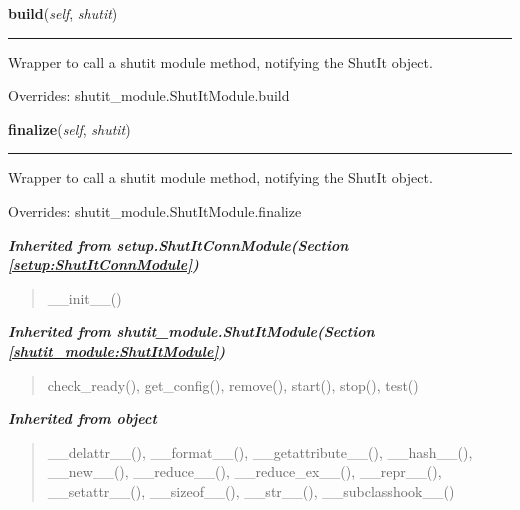     \vspace{0.5ex}

\hspace{.8\funcindent}\begin{boxedminipage}{\funcwidth}

    \raggedright \textbf{build}(\textit{self}, \textit{shutit})

    \vspace{-1.5ex}

    \rule{\textwidth}{0.5\fboxrule}
\setlength{\parskip}{2ex}
    Wrapper to call a shutit module method, notifying the ShutIt object.

\setlength{\parskip}{1ex}
      Overrides: shutit\_module.ShutItModule.build

    \end{boxedminipage}

    \vspace{0.5ex}

\hspace{.8\funcindent}\begin{boxedminipage}{\funcwidth}

    \raggedright \textbf{finalize}(\textit{self}, \textit{shutit})

    \vspace{-1.5ex}

    \rule{\textwidth}{0.5\fboxrule}
\setlength{\parskip}{2ex}
    Wrapper to call a shutit module method, notifying the ShutIt object.

\setlength{\parskip}{1ex}
      Overrides: shutit\_module.ShutItModule.finalize

    \end{boxedminipage}


\large{\textbf{\textit{Inherited from setup.ShutItConnModule\textit{(Section \ref{setup:ShutItConnModule})}}}}

\begin{quote}
\_\_init\_\_()
\end{quote}

\large{\textbf{\textit{Inherited from shutit\_module.ShutItModule\textit{(Section \ref{shutit_module:ShutItModule})}}}}

\begin{quote}
check\_ready(), get\_config(), remove(), start(), stop(), test()
\end{quote}

\large{\textbf{\textit{Inherited from object}}}

\begin{quote}
\_\_delattr\_\_(), \_\_format\_\_(), \_\_getattribute\_\_(), \_\_hash\_\_(), \_\_new\_\_(), \_\_reduce\_\_(), \_\_reduce\_ex\_\_(), \_\_repr\_\_(), \_\_setattr\_\_(), \_\_sizeof\_\_(), \_\_str\_\_(), \_\_subclasshook\_\_()
\end{quote}

